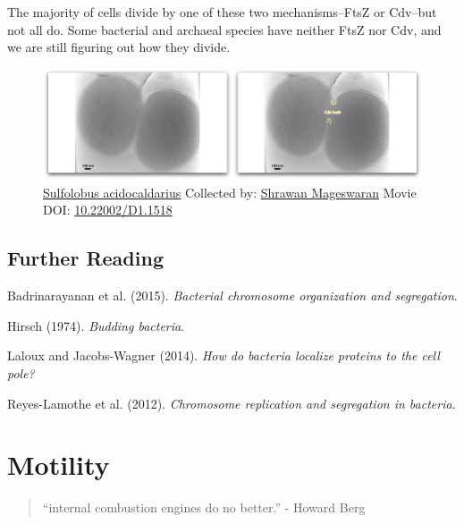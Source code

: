 \documentclass[]{tufte-book}
\begin{document}
The majority of cells divide by one of these two mechanisms--FtsZ or
Cdv--but not all do. Some bacterial and archaeal species have neither
FtsZ nor Cdv, and we are still figuring out how they divide.





\begin{figure}
\includegraphics{movie_stills/5_12} \caption[\protect\hyperlink{tree}{Sulfolobus acidocaldarius} Collected
by: \protect\hyperlink{shrawan_mageswaran}{Shrawan Mageswaran} Movie
DOI: \href{https://doi.org/10.22002/D1.1518}{10.22002/D1.1518}]{\protect\hyperlink{tree}{Sulfolobus acidocaldarius} Collected
by: \protect\hyperlink{shrawan_mageswaran}{Shrawan Mageswaran} Movie
DOI: \href{https://doi.org/10.22002/D1.1518}{10.22002/D1.1518}}\label{fig:5-12}
\end{figure}

\section{Further Reading}\label{further-reading}

Badrinarayanan et al. (2015). \emph{Bacterial chromosome organization
and segregation}.\citep{badrinarayanan2015}

Hirsch (1974). \emph{Budding bacteria}.\citep{hirsch1974}

Laloux and Jacobs-Wagner (2014). \emph{How do bacteria localize proteins
to the cell pole?}\citep{laloux2014}

Reyes-Lamothe et al. (2012). \emph{Chromosome replication and
segregation in bacteria}.\citep{reyes-lamothe2012}

\chapter{Motility}\label{motility}

\begin{quote}
``internal combustion engines do no better.'' - Howard Berg
\citep{berg1988}
\end{quote}
\end{document}

